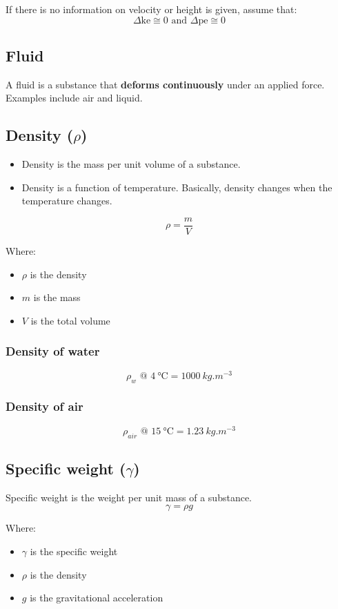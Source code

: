 \documentclass[11pt]{article}
\begin{document}
If there is no information on velocity or height is given, assume that:
\[\Delta \text{ke} \cong 0 \text{ and } \Delta \text{pe} \cong 0\]

\subsection{Fluid}
\label{sec:orgb192458}
A fluid is a substance that \textbf{deforms continuously} under an applied force. Examples include air and liquid.

\subsection{Density (\(\rho\))}
\label{sec:org067c7d3}
\begin{itemize}
\item Density is the mass per unit volume of a substance.
\item Density is a function of temperature. Basically, density changes when the temperature changes.
\end{itemize}
\[\rho = \frac{m}{V}\]

Where:
\begin{itemize}
\item \(\rho\) is the density
\item \(m\) is the mass
\item \(V\) is the total volume
\end{itemize}

\subsubsection{Density of water}
\label{sec:org32e6060}
\[\rho_w \text{ @ } \qty{4}{\degreeCelsius} = \qty{1000}{kg.m^{-3}}\]

\subsubsection{Density of air}
\label{sec:org0e67f2a}
\[\rho_{air} \text{ @ } \qty{15}{\degreeCelsius} = \qty{1.23}{kg.m^{-3}}\]

\subsection{Specific weight (\(\gamma\))}
\label{sec:org57213ec}
Specific weight is the weight per unit mass of a substance.
\[\gamma = \rho g\]

Where:
\begin{itemize}
\item \(\gamma\) is the specific weight
\item \(\rho\) is the density
\item \(g\) is the gravitational acceleration
\end{itemize}
\end{document}
